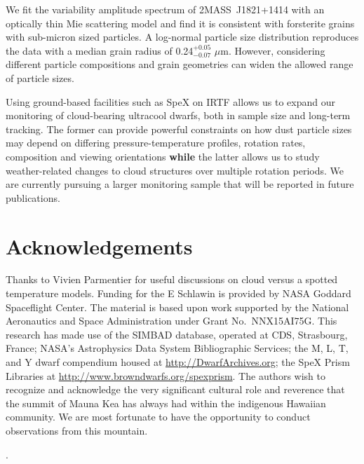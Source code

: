 \documentclass[twocolumn]{aastex6}
\newcommand{\shb}{2MASS~J1821+1414}
\begin{document}
We fit the variability amplitude spectrum of {\shb} with an optically thin Mie scattering model and find it is consistent with forsterite grains with sub-micron sized particles.
A log-normal particle size distribution reproduces the data with a median grain radius of 0.24$^{+0.05}_{-0.07}$ $\mu$m.
However, considering different particle compositions and grain geometries can widen the allowed range of particle sizes.

Using ground-based facilities such as SpeX on IRTF allows us to expand our monitoring of cloud-bearing ultracool dwarfs, both in sample size and long-term tracking. The former can provide powerful constraints on how dust particle sizes may depend on differing pressure-temperature profiles, rotation rates, composition and viewing orientations \textbf{while} the latter allows us to study weather-related changes to cloud structures over multiple rotation periods. We are currently pursuing a larger monitoring sample that will be reported in future publications.


\section{Acknowledgements}
Thanks to Vivien Parmentier for useful discussions on cloud versus a spotted temperature models.
Funding for the E Schlawin is provided by NASA Goddard Spaceflight Center.
The material is based upon work supported by
the National Aeronautics and Space Administration under
Grant No.~NNX15AI75G. 
This research has made
use of the SIMBAD database, operated at CDS, Strasbourg,
France; NASA's Astrophysics Data System Bibliographic
Services; the M, L, T, and Y dwarf compendium
housed at \url{http://DwarfArchives.org}; the SpeX Prism
Libraries at \url{http://www.browndwarfs.org/spexprism}.
The authors wish to recognize and acknowledge the very significant cultural role and reverence that the summit of Mauna Kea has always had within the indigenous Hawaiian community. We are most fortunate to have the opportunity to conduct observations from this mountain.

\acknowledgments

.

\textbf{}
\end{document}
